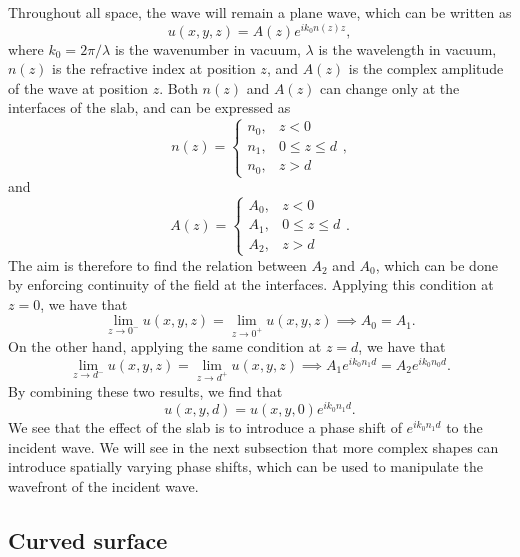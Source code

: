\documentclass[a4paper,10pt]{article}
\begin{document}
Throughout all space, the wave will remain a plane wave, which can be written as
\begin{equation}
    u(x,y,z) = A(z) e^{i k_0 n(z) z},
\end{equation}
where $k_0 = 2 \pi / \lambda$ is the wavenumber in vacuum, $\lambda$ is the wavelength in vacuum, $n(z)$ is the refractive index at position $z$, and $A(z)$ is the complex amplitude of the wave at position $z$. Both $n(z)$ and $A(z)$ can change only at the interfaces of the slab, and can be expressed as
\begin{equation}
    n(z) = \begin{cases}
    n_0, & z < 0 \\
    n_1, & 0 \leq z \leq d \\
    n_0, & z > d
    \end{cases},
\end{equation}
and
\begin{equation}
    A(z) = \begin{cases}
    A_{0}, & z < 0 \\
    A_{1}, & 0 \leq z \leq d \\
    A_{2}, & z > d
    \end{cases}.
\end{equation}
The aim is therefore to find the relation between $A_2$ and $A_0$, which can be done by enforcing continuity of the field at the interfaces. Applying this condition at $z=0$, we have that
\begin{equation}
    \lim_{z \to 0^-} u(x,y,z) = \lim_{z \to 0^+} u(x,y,z) \implies A_0 = A_1.
\end{equation}
On the other hand, applying the same condition at $z=d$, we have that
\begin{equation}
    \lim_{z \to d^-} u(x,y,z) = \lim_{z \to d^+} u(x,y,z) \implies A_1 e^{i k_0 n_1 d} = A_2 e^{i k_0 n_0 d}.
\end{equation}
By combining these two results, we find that
\begin{equation}
    u(x,y,d) = u(x,y,0) e^{i k_0 n_1 d}.
\end{equation}
We see that the effect of the slab is to introduce a phase shift of $e^{i k_0 n_1 d}$ to the incident wave. We will see in the next subsection that more complex shapes can introduce spatially varying phase shifts, which can be used to manipulate the wavefront of the incident wave.

\subsection{Curved surface}
\end{document}
